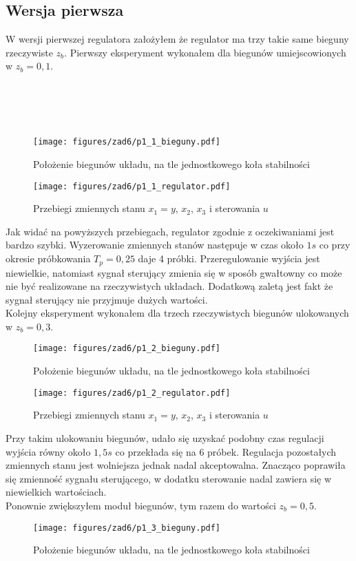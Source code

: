 \documentclass[a4paper,titlepage,11pt,floatssmall]{mwrep}
\begin{document}
\subsection{Wersja pierwsza}
\indent W wersji pierwszej regulatora założyłem że regulator ma trzy takie same bieguny rzeczywiste $z_b$. Pierwszy eksperyment wykonałem dla biegunów umiejscowionych w $z_b = 0,1$.
\bigskip 
\\
\\
\\
\\
\\
\begin{figure}[H]
\centering
\texttt{[image: figures/zad6/p1\_1\_bieguny.pdf]}
\caption{Położenie biegunów układu, na tle jednostkowego koła stabilności}
\end{figure}
\newpage
\begin{figure}[H]
\centering
\texttt{[image: figures/zad6/p1\_1\_regulator.pdf]}
\caption{Przebiegi zmiennych stanu $x_1 = y$, $x_2$, $x_3$ i sterowania $u$}
\end{figure}

Jak widać na powyższych przebiegach, regulator zgodnie z oczekiwaniami jest bardzo szybki. Wyzerowanie zmiennych stanów następuje w czas około $1s$ co przy okresie próbkowania $T_p = 0,25$ daje 4 próbki. Przeregulowanie wyjścia jest niewielkie, natomiast sygnał sterujący zmienia się w sposób gwałtowny co może nie być realizowane na rzeczywistych układach. Dodatkową zaletą jest fakt że sygnał sterujący nie przyjmuje dużych wartości.\\
\newpage
\indent Kolejny eksperyment wykonałem dla trzech rzeczywistych biegunów ulokowanych w $z_b = 0,3$.

\begin{figure}[H]
\centering
\texttt{[image: figures/zad6/p1\_2\_bieguny.pdf]}
\caption{Położenie biegunów układu, na tle jednostkowego koła stabilności}
\end{figure}

\begin{figure}[H]
\centering
\texttt{[image: figures/zad6/p1\_2\_regulator.pdf]}
\caption{Przebiegi zmiennych stanu $x_1 = y$, $x_2$, $x_3$ i sterowania $u$}
\end{figure}
\newpage

\indent Przy takim ulokowaniu biegunów, udało się uzyskać podobny czas regulacji wyjścia równy około $1,5s$ co przekłada się na 6 próbek. Regulacja pozostałych zmiennych stanu jest wolniejsza jednak nadal akceptowalna. Znacząco poprawiła się zmienność sygnału sterującego, w dodatku sterowanie nadal zawiera się w niewielkich wartościach. \\
\indent Ponownie zwiększyłem moduł biegunów, tym razem do wartości $z_b = 0,5$.
\begin{figure}[H]
\centering
\texttt{[image: figures/zad6/p1\_3\_bieguny.pdf]}
\caption{Położenie biegunów układu, na tle jednostkowego koła stabilności}
\end{figure}
\end{document}
